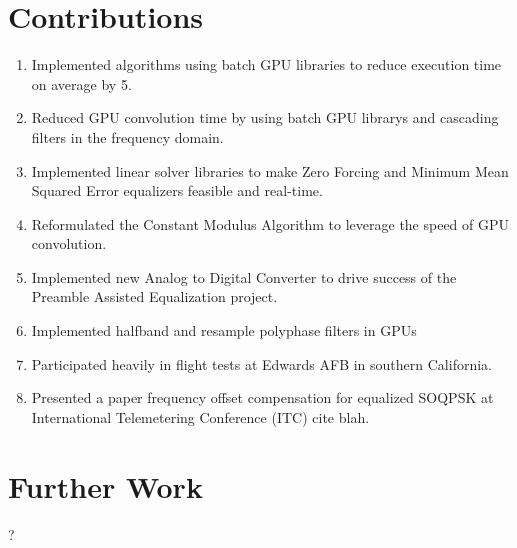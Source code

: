 \section{Contributions}
\begin{enumerate}
\item Implemented algorithms using batch GPU libraries to reduce execution time on average by 5.
\item Reduced GPU convolution time by using batch GPU librarys and cascading filters in the frequency domain.
\item Implemented linear solver libraries to make Zero Forcing and Minimum Mean Squared Error equalizers feasible and real-time.
\item Reformulated the Constant Modulus Algorithm to leverage the speed of GPU convolution.
\item Implemented new Analog to Digital Converter to drive success of the Preamble Assisted Equalization project.
\item Implemented halfband and resample polyphase filters in GPUs
\item Participated heavily in flight tests at Edwards AFB in southern California.
\item Presented a paper frequency offset compensation for equalized SOQPSK at International Telemetering Conference (ITC) cite blah.
\end{enumerate}

\section{Further Work}
?